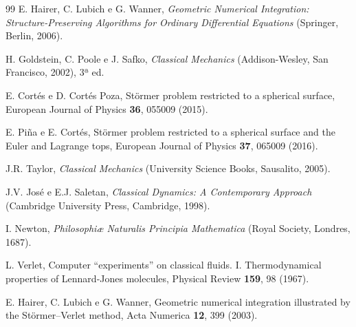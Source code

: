\documentclass[twocolumn]{rbef}
\begin{document}
\begin{thebibliography}{99}
 E. Hairer, C. Lubich e G. Wanner, \textit{Geometric Numerical Integration: Structure-Preserving Algorithms for Ordinary Differential Equations} (Springer, Berlin, 2006).

 H. Goldstein, C. Poole e J. Safko, \textit{Classical Mechanics} (Addison-Wesley, San Francisco, 2002), 3ª ed.

 E. Cortés e D. Cortés Poza, Störmer problem restricted to a spherical surface, European Journal of Physics \textbf{36}, 055009 (2015).

 E. Piña e E. Cortés, Störmer problem restricted to a spherical surface and the Euler and Lagrange tops, European Journal of Physics \textbf{37}, 065009 (2016).

 J.R. Taylor, \textit{Classical Mechanics} (University Science Books, Sausalito, 2005).

 J.V. José e E.J. Saletan, \textit{Classical Dynamics: A Contemporary Approach} (Cambridge University Press, Cambridge, 1998).

 I. Newton, \textit{Philosophiæ Naturalis Principia Mathematica} (Royal Society, Londres, 1687).

 L. Verlet, Computer ``experiments'' on classical fluids. I. Thermodynamical properties of Lennard-Jones molecules, Physical Review \textbf{159}, 98 (1967).

 E. Hairer, C. Lubich e G. Wanner, Geometric numerical integration illustrated by the Störmer--Verlet method, Acta Numerica \textbf{12}, 399 (2003).

\end{thebibliography}
\end{document}
